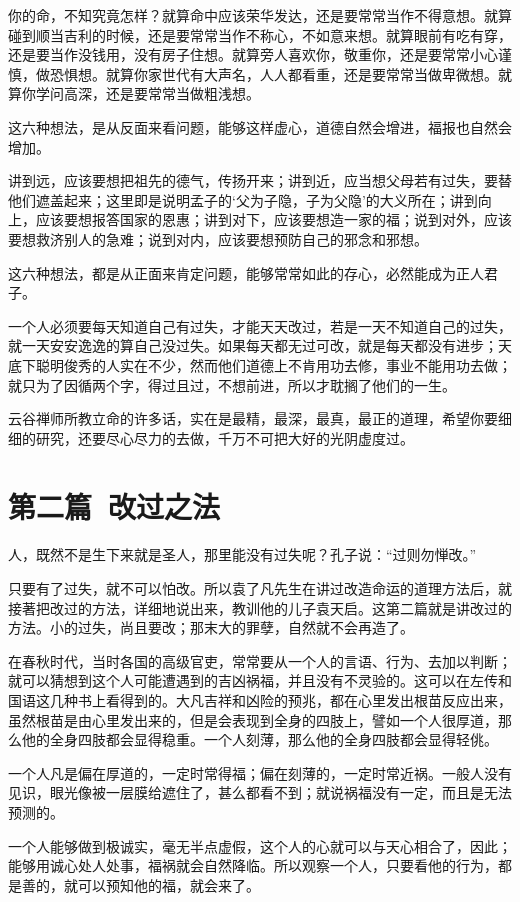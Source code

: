 \documentclass[12pt,twoside,openany]{book}
\begin{document}
你的命，不知究竟怎样？就算命中应该荣华发达，还是要常常当作不得意想。就算碰到顺当吉利的时候，还是要常常当作不称心，不如意来想。就算眼前有吃有穿，还是要当作没钱用，没有房子住想。就算旁人喜欢你，敬重你，还是要常常小心谨慎，做恐惧想。就算你家世代有大声名，人人都看重，还是要常常当做卑微想。就算你学问高深，还是要常常当做粗浅想。

这六种想法，是从反面来看问题，能够这样虚心，道德自然会增进，福报也自然会增加。

讲到远，应该要想把祖先的德气，传扬开来；讲到近，应当想父母若有过失，要替他们遮盖起来；这里即是说明孟子的‘父为子隐，子为父隐’的大义所在；讲到向上，应该要想报答国家的恩惠；讲到对下，应该要想造一家的福；说到对外，应该要想救济别人的急难；说到对内，应该要想预防自己的邪念和邪想。

这六种想法，都是从正面来肯定问题，能够常常如此的存心，必然能成为正人君子。

一个人必须要每天知道自己有过失，才能天天改过，若是一天不知道自己的过失，就一天安安逸逸的算自己没过失。如果每天都无过可改，就是每天都没有进步；天底下聪明俊秀的人实在不少，然而他们道德上不肯用功去修，事业不能用功去做；就只为了因循两个字，得过且过，不想前进，所以才耽搁了他们的一生。

云谷禅师所教立命的许多话，实在是最精，最深，最真，最正的道理，希望你要细细的研究，还要尽心尽力的去做，千万不可把大好的光阴虚度过。

\chapter{第二篇\ 改过之法}
人，既然不是生下来就是圣人，那里能没有过失呢？孔子说：“过则勿惮改。”

只要有了过失，就不可以怕改。所以袁了凡先生在讲过改造命运的道理方法后，就接著把改过的方法，详细地说出来，教训他的儿子袁天启。这第二篇就是讲改过的方法。小的过失，尚且要改；那末大的罪孽，自然就不会再造了。

在春秋时代，当时各国的高级官吏，常常要从一个人的言语、行为、去加以判断；就可以猜想到这个人可能遭遇到的吉凶祸福，并且没有不灵验的。这可以在左传和国语这几种书上看得到的。大凡吉祥和凶险的预兆，都在心里发出根苗反应出来，虽然根苗是由心里发出来的，但是会表现到全身的四肢上，譬如一个人很厚道，那么他的全身四肢都会显得稳重。一个人刻薄，那么他的全身四肢都会显得轻佻。

一个人凡是偏在厚道的，一定时常得福；偏在刻薄的，一定时常近祸。一般人没有见识，眼光像被一层膜给遮住了，甚么都看不到；就说祸福没有一定，而且是无法预测的。

一个人能够做到极诚实，毫无半点虚假，这个人的心就可以与天心相合了，因此；能够用诚心处人处事，福祸就会自然降临。所以观察一个人，只要看他的行为，都是善的，就可以预知他的福，就会来了。
\end{document}

